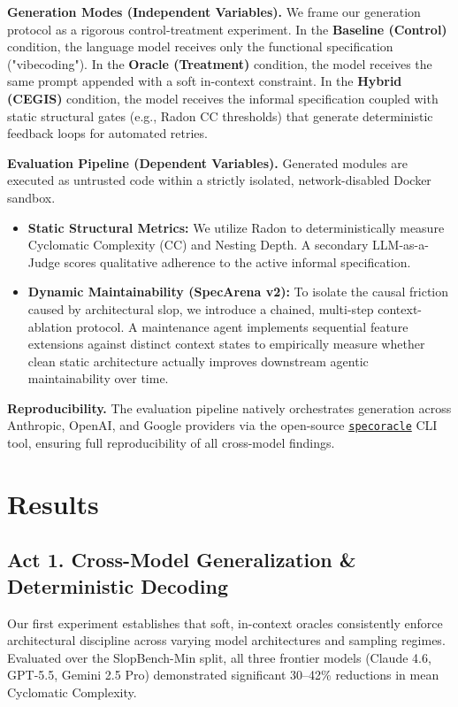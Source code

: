 \documentclass[11pt]{article}
\begin{document}
\textbf{Generation Modes (Independent Variables).} 
We frame our generation protocol as a rigorous control-treatment experiment. In the \textbf{Baseline (Control)} condition, the language model receives only the functional specification ("vibecoding"). In the \textbf{Oracle (Treatment)} condition, the model receives the same prompt appended with a soft in-context constraint. In the \textbf{Hybrid (CEGIS)} condition, the model receives the informal specification coupled with static structural gates (e.g., Radon CC thresholds) that generate deterministic feedback loops for automated retries.

\textbf{Evaluation Pipeline (Dependent Variables).} 
Generated modules are executed as untrusted code within a strictly isolated, network-disabled Docker sandbox.
\begin{itemize}
    \item \textbf{Static Structural Metrics:} We utilize Radon \cite{Radon} to deterministically measure Cyclomatic Complexity (CC) and Nesting Depth. A secondary LLM-as-a-Judge \cite{Zheng2023Judge} scores qualitative adherence to the active informal specification.
    \item \textbf{Dynamic Maintainability (SpecArena v2):} To isolate the causal friction caused by architectural slop, we introduce a chained, multi-step context-ablation protocol. A maintenance agent implements sequential feature extensions against distinct context states to empirically measure whether clean static architecture actually improves downstream agentic maintainability over time.
\end{itemize}

\textbf{Reproducibility.} 
The evaluation pipeline natively orchestrates generation across Anthropic, OpenAI, and Google providers via the open-source \href{https://github.com/davidkimai/specoracle}{\texttt{specoracle}} CLI tool, ensuring full reproducibility of all cross-model findings.

\section{Results}

\subsection{Act 1. Cross-Model Generalization \& Deterministic Decoding}

Our first experiment establishes that soft, in-context oracles consistently enforce architectural discipline across varying model architectures and sampling regimes. Evaluated over the SlopBench-Min split, all three frontier models (Claude 4.6, GPT-5.5, Gemini 2.5 Pro) demonstrated significant 30--42\% reductions in mean Cyclomatic Complexity.
\end{document}
